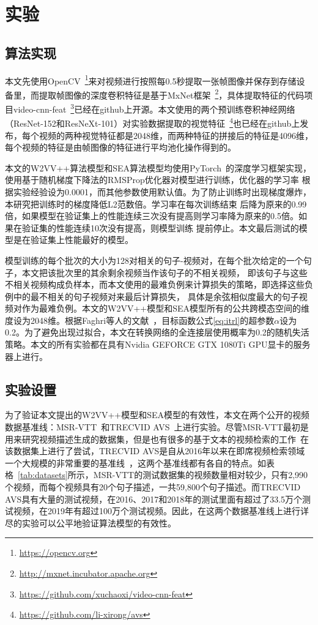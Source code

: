 \chapter{实验}
\section{算法实现}
本文先使用OpenCV~\footnote{\url{https://opencv.org}}来对视频进行按照每0.5秒提取一张帧图像并保存到存储设备里，而提取帧图像的深度卷积特征是基于MxNet框架~\footnote{\url{http://mxnet.incubator.apache.org}}，具体提取特征的代码项目video-cnn-feat~\footnote{\url{https://github.com/xuchaoxi/video-cnn-feat}}已经在github上开源。本文使用的两个预训练卷积神经网络（ResNet-152和ResNeXt-101）对实验数据提取的视觉特征~\footnote{\url{https://github.com/li-xirong/avs}}也已经在github上发布，每个视频的两种视觉特征都是2048维，而两种特征的拼接后的特征是4096维，每个视频的特征是由帧图像的特征进行平均池化操作得到的。

本文的W2VV++算法模型和SEA算法模型均使用PyTorch~\cite{pytorch}的深度学习框架实现，使用基于随机梯度下降法的RMSProp优化器对模型进行训练，优化器的学习率
根据实验经验设为0.0001，而其他参数使用默认值。为了防止训练时出现梯度爆炸，本研究把训练时的梯度降低L2范数倍。学习率在每次训练结束
后降为原来的0.99倍，如果模型在验证集上的性能连续三次没有提高则学习率降为原来的0.5倍。如果在验证集的性能连续10次没有提高，则模型训练
提前停止。本文最后测试的模型是在验证集上性能最好的模型。

模型训练的每个批次的大小为128对相关的句子-视频对，在每个批次给定的一个句子，本文把该批次里的其余剩余视频当作该句子的不相关视频，
即该句子与这些不相关视频构成负样本，而本文使用的最难负例来计算损失的策略，即选择这些负例中的最不相关的句子视频对来最后计算损失，
具体是余弦相似度最大的句子视频对作为最难负例。本文的W2VV++模型和SEA模型所有的公共跨模态空间的维度设为2048维。根据Faghri等人的文献~\cite{faghri2017vse++}，目标函数公式\ref{eq:itrl}的超参数$\alpha$设为0.2。为了避免出现过拟合，本文在转换网络的全连接层使用概率为0.2的随机失活策略。本文的所有实验都在具有Nvidia GEFORCE GTX 1080Ti GPU显卡的服务器上进行。

\section{实验设置}
为了验证本文提出的W2VV++模型和SEA模型的有效性，本文在两个公开的视频数据基准线：MSR-VTT~\cite{msrvtt}和TRECVID AVS~\cite{awad2016trecvid}上进行实验。尽管MSR-VTT最初是用来研究视频描述生成的数据集，但是也有很多的基于文本的视频检索的工作~\cite{mithun2018learning,miech2019howto100m,dong2019dual,liu2019use,yu2018a}在该数据集上进行了尝试，TRECVID AVS是自从2016年以来在即席视频检索领域一个大规模的非常重要的基准线~\cite{awad2016trecvid,awad2017trecvid,awad2018trecvid,awad2019trecvid}，这两个基准线都有各自的特点。如表格~\ref{tab:datasets}所示，MSR-VTT的测试数据集的视频数量相对较少，只有2,990个视频，而每个视频具有20个句子描述，一共59,800个句子描述。而TRECVID AVS具有大量的测试视频，在2016、2017和2018年的测试里面有超过了33.5万个测试视频，在2019年有超过100万个测试视频。因此，在这两个数据基准线上进行详尽的实验可以公平地验证算法模型的有效性。

